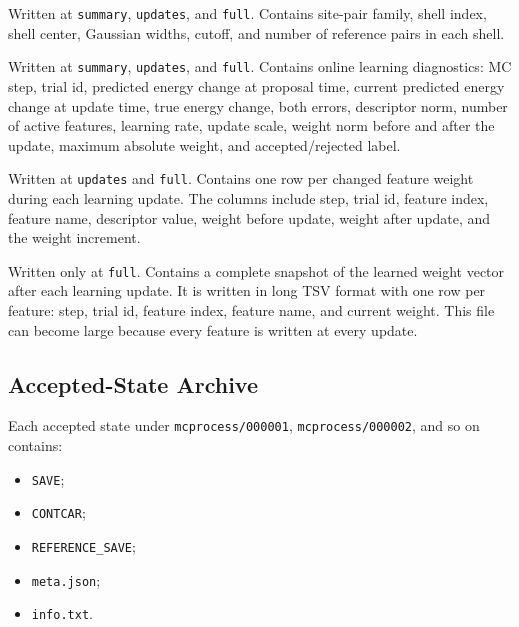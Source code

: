 \documentclass[11pt]{article}
\begin{document}
\begin{description}[leftmargin=3.2cm,style=nextline]
\item[\texttt{prefast\_basis.log}]
Written at \texttt{summary}, \texttt{updates}, and \texttt{full}. Contains site-pair family, shell index, shell center, Gaussian widths, cutoff, and number of reference pairs in each shell.

\item[\texttt{prefast\_learning.log}]
Written at \texttt{summary}, \texttt{updates}, and \texttt{full}. Contains online learning diagnostics: MC step, trial id, predicted energy change at proposal time, current predicted energy change at update time, true energy change, both errors, descriptor norm, number of active features, learning rate, update scale, weight norm before and after the update, maximum absolute weight, and accepted/rejected label.

\item[\texttt{prefast\_weight\_updates.log}]
Written at \texttt{updates} and \texttt{full}. Contains one row per changed feature weight during each learning update. The columns include step, trial id, feature index, feature name, descriptor value, weight before update, weight after update, and the weight increment.

\item[\texttt{prefast\_weights.log}]
Written only at \texttt{full}. Contains a complete snapshot of the learned weight vector after each learning update. It is written in long TSV format with one row per feature: step, trial id, feature index, feature name, and current weight. This file can become large because every feature is written at every update.
\end{description}

\subsection{Accepted-State Archive}

Each accepted state under \texttt{mcprocess/000001}, \texttt{mcprocess/000002}, and so on contains:

\begin{itemize}
  \item \texttt{SAVE};
  \item \texttt{CONTCAR};
  \item \texttt{REFERENCE\_SAVE};
  \item \texttt{meta.json};
  \item \texttt{info.txt}.
\end{itemize}
\end{document}
